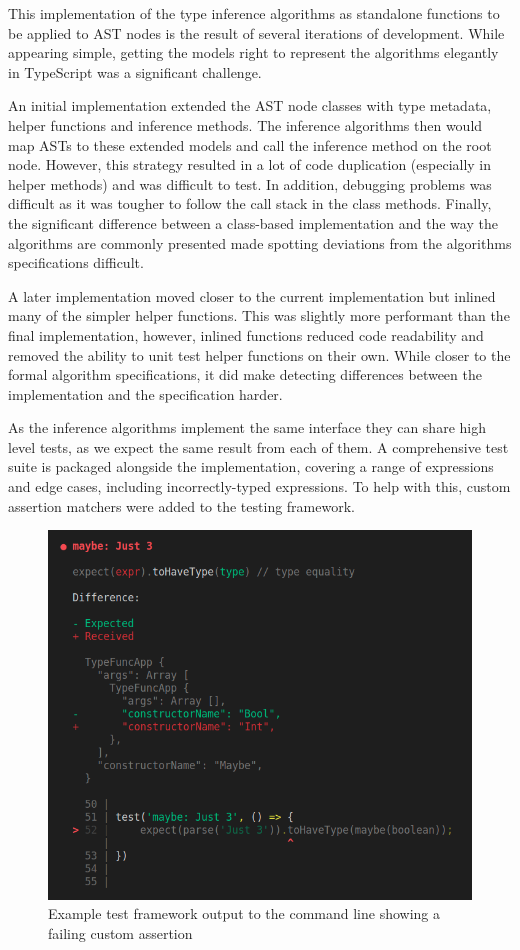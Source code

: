 \documentclass[a4paper,fleqn,oneside,12pt]{report}
\begin{document}
This implementation of the type inference algorithms as standalone functions to be applied to AST nodes is the result of several iterations of development. While appearing simple, getting the models right to represent the algorithms elegantly in TypeScript was a significant challenge.

An initial implementation extended the AST node classes with type metadata, helper functions and inference methods. The inference algorithms then would map ASTs to these extended models and call the inference method on the root node. However, this strategy resulted in a lot of code duplication (especially in helper methods) and was difficult to test. In addition, debugging problems was difficult as it was tougher to follow the call stack in the class methods. Finally, the significant difference between a class-based implementation and the way the algorithms are commonly presented made spotting deviations from the algorithms specifications difficult.

A later implementation moved closer to the current implementation but inlined many of the simpler helper functions. This was slightly more performant than the final implementation, however, inlined functions reduced code readability and removed the ability to unit test helper functions on their own. While closer to the formal algorithm specifications, it did make detecting differences between the implementation and the specification harder.

As the inference algorithms implement the same interface they can share high level tests, as we expect the same result from each of them. A comprehensive test suite is packaged alongside the implementation, covering a range of expressions and edge cases, including incorrectly-typed expressions. To help with this, custom assertion matchers were added to the testing framework.

{\centering \begin{figure}[h!]
  \centering
  \includegraphics[width=0.769\linewidth]{images/image9.png}
  \caption{Example test framework output to the command line showing a failing custom assertion}
\end{figure} \par}
\end{document}

